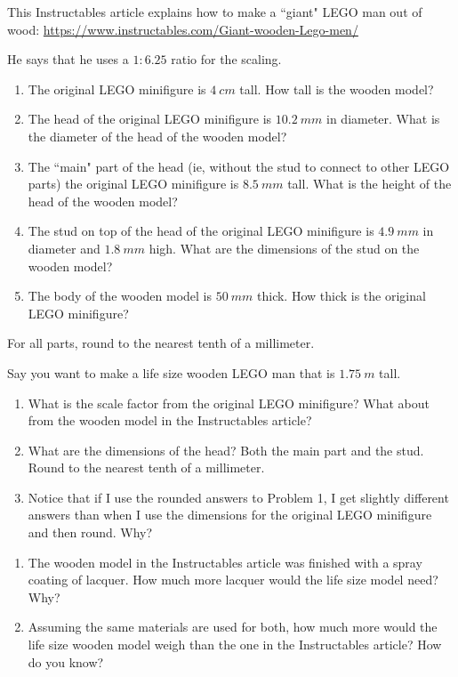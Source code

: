 \documentclass[handout,nooutcomes,noauthor,hints]{../ximera}
\begin{document}
\mynewpage
\begin{question}
 This Instructables article explains how to make a ``giant" LEGO man out of wood: \url{https://www.instructables.com/Giant-wooden-Lego-men/}
 
 He says that he uses a $1:6.25$ ratio for the scaling. 
 
\begin{enumerate}
 \item The original LEGO minifigure is $4 \ cm$ tall. How tall is the wooden model?
 \item The head of the original LEGO minifigure is $10.2\ mm$ in diameter. What is the diameter of the head of the wooden model?
 \item The ``main" part of the head (ie, without the stud to connect to other LEGO parts) the original LEGO minifigure is $8.5\ mm$ tall. What is the height of the head of the wooden model?
\item The stud on top of the head of the original LEGO minifigure is $4.9 \ mm$ in diameter and $1.8 \ mm$ high. What are the dimensions of the stud on the wooden model?
 \item The body of the wooden model is $50 \ mm$ thick. How thick is the original LEGO minifigure?
 
\end{enumerate}
For all parts, round to the nearest tenth of a millimeter.
\end{question}
\mynewpage

\begin{question}
 Say you want to make a life size wooden LEGO man that is $1.75 \ m$ tall. 
 
\begin{enumerate}
 \item What is the scale factor from the original LEGO minifigure? What about from the wooden model in the Instructables article?
 \item What are the dimensions of the head? Both the main part and the stud. Round to the nearest tenth of a millimeter.
 \item Notice that if I use the rounded answers to Problem 1, I get slightly different answers than when I use the dimensions for the original LEGO minifigure and then round. Why?
 \end{enumerate}
 \end{question}
\mynewpage

\begin{question} 
\begin{enumerate}
 \item The wooden model in the Instructables article was finished with a spray coating of lacquer. How much more lacquer would the life size model need? Why?
 \item Assuming the same materials are used for both, how much more would the life size wooden model weigh than the one in the Instructables article?  How do you know?
\end{enumerate}
\end{question}
\end{document}
